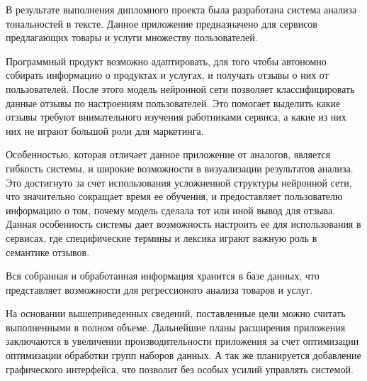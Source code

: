 \setcounter{page}{81}
\label{sec:outro}
В результате выполнения дипломного проекта была разработана система анализа тональностей в тексте. Данное приложение предназначено для сервисов предлагающих товары и услуги множеству пользователей.

Программный продукт возможно адаптировать, для того чтобы автономно собирать информацию о продуктах и услугах, и получать отзывы о них от пользователей. После этого модель нейронной сети позволяет классифицировать данные отзывы по настроениям пользователей. Это помогает выделить какие отзывы требуют внимательного изучения работниками сервиса, а какие из них них не играют большой роли для маркетинга.

Особенностью, которая отличает данное приложение от аналогов, является гибкость системы, и широкие возможности в визуализации результатов анализа. Это достигнуто за счет использования усложненной структуры нейронной сети, что значительно сокращает время ее обучения, и предоставляет пользователю информацию о том, почему модель сделала тот или иной вывод для отзыва. Данная особенность системы дает возможность настроить ее для использования в сервисах, где специфические термины и лексика играют важную роль в семантике отзывов.

Вся собранная и обработанная информация хранится в базе данных, что представляет возможности для регрессионого анализа товаров и услуг.

На основании вышеприведенных сведений, поставленные цели можно считать выполненными в полном объеме. Дальнейшие планы расширения приложения заключаются в увеличении производительности приложения за счет оптимизации оптимизации обработки групп наборов данных. А так же планируется добавление графического интерфейса, что позволит без особых усилий управлять системой.